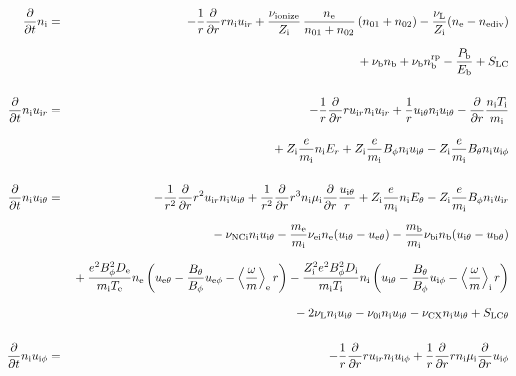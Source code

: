 \documentclass[11pt]{article}
\def\r#1{{\rm#1}}
\def\ddt{\frac{\partial}{\partial t}}
\def\ddr{\frac{\partial}{\partial r}}
\def\ave#1{\left\langle#1\right\rangle}
\def\me{m_\r{e}}
\def\mi{m_\r{i}}
\def\mb{m_\r{b}}
\def\mue{\mu_\r{e}}
\def\mui{\mu_\r{i}}
\def\De{D_\r{e}}
\def\Di{D_\r{i}}
\def\ne{n_\r{e}}
\def\ni{n_\r{i}}
\def\nb{n_\r{b}}
\def\uir{u_{\r{i}r}}
\def\ueth{u_{\r{e}\theta}}
\def\uith{u_{\r{i}\theta}}
\def\ubth{u_{\r{b}\theta}}
\def\ueph{u_{\r{e}\phi}}
\def\uiph{u_{\r{i}\phi}}
\def\Er{E_r}
\def\Eth{E_\theta}
\def\Bth{B_\theta}
\def\Bph{B_\phi}
\def\Te{T_\r{e}}
\def\Ti{T_\r{i}}
\def\nna{n_{01}}
\def\nnb{n_{02}}
\def\Zi{Z_\r{i}}
\def\Pb{P_\r{b}}
\def\Eb{E_\r{b}}
\def\nbrp{n_\r{b}^\r{rp}}
\def\nuNCi{\nu_\r{NCi}}
\def\nuei{\nu_\r{ei}}
\def\nuni{\nu_\r{0i}}
\def\nuL{\nu_\r{L}}
\def\nuCX{\nu_\r{CX}}
\def\nuion{\nu_\r{ionize}}
\def\nub{\nu_\r{b}}
\def\nediv{n_\r{ediv}}
\newcommand{\Frac}[2]{%
  {\displaystyle {\displaystyle #1\over \displaystyle #2}}%
}
\newcommand{\rdprd}[2]{\Frac{\partial #1}{\partial #2}}
\newcommand{\aveaveB}[1]{\left< \!\! \left< #1 \right> \!\! \right>}
\begin{document}
\begin{eqnarray}
%
%
  \ddt\ni &=&
%
  - \frac{1}{r} \ddr r \ni \uir
%
  + \frac{\nuion}{\Zi}\, \frac{\ne}{\nna+\nnb}\, (\nna+\nnb)
%
  - \frac{\nuL}{\Zi} (\ne - \nediv) 
\nonumber\\[2.5mm]&&{}
%
  + \nub \nb
%
  + \nub \nbrp
%
  - \frac{\Pb}{\Eb}
%
  + S_\r{LC}
\\[5mm]
%
%
  \ddt \ni \uir &=&
%
  - \frac{1}{r} \ddr r \uir \ni \uir
%
  + \frac{1}{r} \uith \ni \uith
%
  - \ddr \frac{\ni \Ti}{\mi}
\nonumber\\[3mm]&&{}
%
  + \Zi \frac{e}{\mi}\ni \Er
%
  + \Zi \frac{e}{\mi} \Bph \ni \uith
%
  - \Zi \frac{e}{\mi} \Bth \ni \uiph
\\[5mm]
%
%
  \ddt \ni \uith &=&
%
  - \frac{1}{r^2} \ddr r^2 \uir \ni \uith
%
  + \frac{1}{r^2} \ddr r^3 \ni \mui \ddr \frac{\uith}{r}
%
  + \Zi \frac{e}{\mi} \ni \Eth
%
  - \Zi \frac{e}{\mi} \Bph \ni \uir
\nonumber\\[2.5mm]&&{}
%
  - \nuNCi \ni \uith
%
  - \frac{\me}{\mi} \nuei \ne (\uith - \ueth)
%
  - \frac{\mb}{\mi} \nu_\r{bi} \nb (\uith - \ubth)
\nonumber\\[2.5mm]&&{}
%
  + \frac{e^2 \Bph^2 \De}{\mi\Te}\ne
    \left(\ueth - \frac{\Bth}{\Bph}\ueph - \ave{\frac{\omega}{m}}_\r{e}
     r \right)
%
  - \frac{\Zi^2 e^2 \Bph^2 \Di}{\mi\Ti}\ni
    \left(\uith - \frac{\Bth}{\Bph}\uiph - \ave{\frac{\omega}{m}}_\r{i}
     r \right)
%
\nonumber\\[2.5mm]&&{}
%
  - 2 \nuL \ni \uith
%
  - \nuni \ni \uith
%
  - \nuCX \ni \uith
%
  + S_\r{LC\theta}
%
%
\\[5mm]
%
%
  \ddt \ni \uiph &=&
%
  - \frac{1}{r} \ddr r \uir \ni \uiph
%
  + \frac{1}{r} \ddr r \ni \mui \ddr \uiph

\end{eqnarray}
\end{document}
